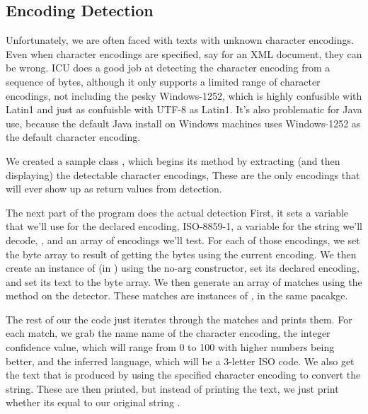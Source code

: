 \subsection{Encoding Detection}

Unfortunately, we are often faced with texts with unknown character
encodings.  Even when character encodings are specified, say for an
XML document, they can be wrong.  ICU does a good job at detecting the
character encoding from a sequence of bytes, although it only supports
a limited range of character encodings, not including the pesky
Windows-1252, which is highly confusible with Latin1 and just as
confuisble with UTF-8 as Latin1.  It's also problematic for Java use,
because the default Java install on Windows machines uses Windows-1252 as
the default character encoding.

We created a sample class , which begins its
 method by extracting (and then displaying) the detectable
character encodings,
%
%
These are the only encodings that will ever show up as return values
from detection.  

The next part of the program does the actual detection
%
%
First, it sets a variable that we'll use for the declared encoding,
ISO-8859-1, a variable for the string we'll decode,
, and an array of encodings we'll test.
For each of those encodings, we set the byte array  to result
of getting the bytes using the current encoding.  We then create an
instance of  (in ) using
the no-arg constructor, set its declared encoding, and set its text to
the byte array.  We then generate an array of matches using the
 method on the detector.  These matches are instances
of , in the same pacakge.  

The rest of our the code just iterates through the matches and prints them.
%
%
For each match, we grab the name name of the character encoding, the
integer confidence value, which will range from 0 to 100 with higher
numbers being better, and the inferred language, which will be a
3-letter ISO code.  We also get the text that is produced by using
the specified character encoding to convert the string.  
These are then printed, but instead of printing the text, we just
print whether its equal to our original string .

